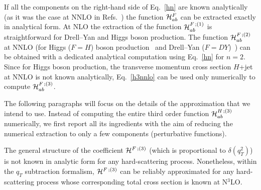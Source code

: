\documentclass[12pt]{article}
\DeclareRobustCommand{\qt}{q_T}
\begin{document}
If all the components on the right-hand side of Eq.~\eqref{hn} are known analytically (as it was the case at NNLO in Refs.~\cite{Catani:2011kr,Catani:2012qa}) the function ${\cal H}_{ab}^{F}$ can be extracted exactly in analytical form. At NLO the extraction of the function  ${\cal H}_{ab}^{F \,;(1)}$ is straightforward for Drell--Yan and Higgs boson production. The function ${\cal H}_{ab}^{F \,;(2)}$ at NNLO (for Higgs ($F=H$) boson production~\cite{Catani:2011kr} and Drell--Yan ($F=DY$)~\cite{Catani:2012qa}) can be obtained with a dedicated analytical computation using Eq.~\eqref{hn} for $n=2$. Since for Higgs boson production, the transverse momentum cross section $H$+jet at NNLO is not known analytically, Eq.~\eqref{h3nnlo} can be used only numerically to compute ${\cal H}_{ab}^{F\,;(3)}$. 

The following paragraphs will focus on the details of the approximation that we intend to use. Instead of computing the entire third order function ${\cal H}_{ab}^{H\,;(3)}$ numerically, we first report all its ingredients with the aim of reducing the numerical extraction to only a few components (perturbative functions). 

The general structure of the coefficient ${\cal H}^{F \,;(3)}$ (which is proportional to $\delta(\qt^{2})$) is not known in analytic form for any hard-scattering process. Nonetheless, within the $\qt$ subtraction  formalism, ${\cal H}^{F \,;(3)}$ can be reliably approximated for any hard-scattering process whose corresponding total cross section is known at N$^{3}$LO. 
\end{document}
